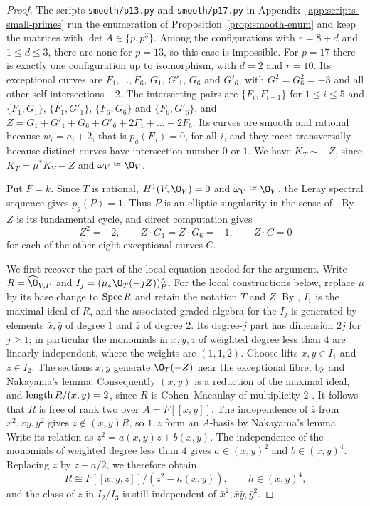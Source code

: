 \begin{proof}
The scripts \texttt{smooth/p13.py} and \texttt{smooth/p17.py} in Appendix~\ref{app:scripts-small-primes} run the enumeration of Proposition~\ref{prop:smooth-enum} and keep the matrices with $\det A\in\{p,p^3\}$.
Among the configurations with $r = 8+d$ and $1\leq d\leq 3$, there are none for $p = 13$, so this case is impossible.
For $p = 17$ there is exactly one configuration up to isomorphism, with $d = 2$ and $r = 10$.
Its exceptional curves are $F_1,\dots,F_6$, $G_1$, $G'_1$, $G_6$ and $G'_6$, with $G_1^2 = G_6^2 = -3$ and all other self-intersections $-2$.
The intersecting pairs are $\{F_i,F_{i+1}\}$ for $1\leq i\leq 5$ and $\{F_1,G_1\}$, $\{F_1,G'_1\}$, $\{F_6,G_6\}$ and $\{F_6,G'_6\}$, and $Z = G_1+G'_1+G_6+G'_6+2F_1+\dots+2F_6$.
Its curves are smooth and rational because $w_i = a_i+2$, that is $p_a(E_i) = 0$, for all $i$, and they meet transversally because distinct curves have intersection number $0$ or $1$.
We have $K_T\sim -Z$, since $K_T = \mu^*K_V-Z$ and $\omega_V\cong\O_V$.

Put $F = \overline k$.
Since $T$ is rational, $H^1(V,\O_V) = 0$ and $\omega_V\cong\O_V$, the Leray spectral sequence gives $p_g(P) = 1$.
Thus $P$ is an elliptic singularity in the sense of \cite[Definition~5.1]{Tan25}.
By \cite[Lemma~5.2]{Tan25}, $Z$ is its fundamental cycle, and direct computation gives
\[
  Z^2 = -2,\qquad Z\cdot G_1 = Z\cdot G_6 = -1,
  \qquad Z\cdot C = 0
\]
for each of the other eight exceptional curves $C$.

We first recover the part of the local equation needed for the argument.
Write $R = \widehat\O_{V,P}$ and $I_j = (\mu_*\O_T(-jZ))_P^{\wedge}$.
For the local constructions below, replace $\mu$ by its base change to $\operatorname{Spec} R$ and retain the notation $T$ and $Z$.
By \cite[Notation~5.15, Lemmas~5.12 and~5.21, and Theorem~5.23]{Tan25}, $I_1$ is the maximal ideal of $R$, and the associated graded algebra for the $I_j$ is generated by elements $\bar x,\bar y$ of degree $1$ and $\bar z$ of degree $2$.
Its degree-$j$ part has dimension $2j$ for $j\geq 1$; in particular the monomials in $\bar x,\bar y,\bar z$ of weighted degree less than $4$ are linearly independent, where the weights are $(1,1,2)$.
Choose lifts $x,y\in I_1$ and $z\in I_2$.
The sections $x,y$ generate $\O_T(-Z)$ near the exceptional fibre, by \cite[Theorem~5.7]{Tan25} and Nakayama's lemma.
Consequently $(x,y)$ is a reduction of the maximal ideal, and $\operatorname{length} R/(x,y) = 2$, since $R$ is Cohen--Macaulay of multiplicity $2$ \cite[Theorem~5.23]{Tan25}.
It follows that $R$ is free of rank two over $A = F[[x,y]]$.
The independence of $\bar z$ from $\bar x^2,\bar x\bar y,\bar y^2$ gives $z\notin(x,y)R$, so $1,z$ form an $A$-basis by Nakayama's lemma.
Write its relation as $z^2 = a(x,y)z+b(x,y)$.
The independence of the monomials of weighted degree less than $4$ gives $a\in(x,y)^2$ and $b\in(x,y)^4$.
Replacing $z$ by $z-a/2$, we therefore obtain
\[
  R\cong F[[x,y,z]]/(z^2-h(x,y)),\qquad h\in(x,y)^4,
\]
and the class of $z$ in $I_2/I_3$ is still independent of $\bar x^2,\bar x\bar y,\bar y^2$.


\end{proof}
